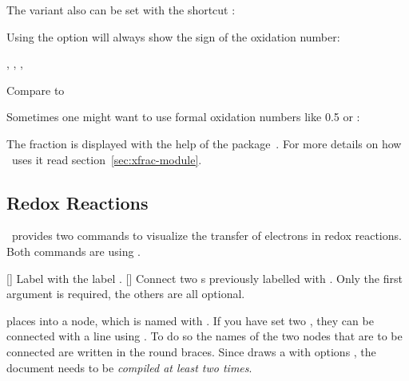 \documentclass{chemmacros-manual}
\begin{document}
The  variant also can be set with the shortcut \sarg:
\begin{example}
   
\end{example}

Using the  option will always show the sign of the
oxidation number:
\begin{example}
  , , , 
\end{example}

\begin{example}
  Compare  to 
\end{example}

Sometimes one might want to use formal oxidation numbers like \num{.5} or
:
\begin{example}

\end{example}

The fraction is displayed with the help of the 
package~\cite{bnd:l3packages}.  For more details on how \chemmacros\ uses it
read section~\vref{sec:xfrac-module}.

\subsection{Redox Reactions}\label{sec:redox-reactions}

\chemmacros\ provides two commands to visualize the transfer of electrons in
redox reactions.  Both commands are using \TikZ.
\begin{commands}
  []
    Label  with the label .
  []
    Connect two s previously labelled with .  Only the first
    argument  is required, the others are all
    optional.
\end{commands}

 places  into a node, which is named with .  If
you have set two , they can be connected with a line using .
To do so the names of the two nodes that are to be connected are written in
the round braces.  Since  draws a  with options
, the document needs to be \emph{compiled at
  least two times}.
\end{document}
